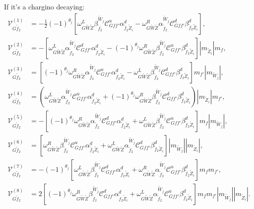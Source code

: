 \documentclass[final,3p,times]{elsarticle}
\begin{document}
If it's a chargino decaying:
\begin{align}
\mathcal{V}_{G \tilde{f}_2}^{(1)} &= -\frac{1}{2}(-1)^{\theta_j}[\omega_{G \tilde{W} \tilde{Z}}^L \beta_{\tilde{f}_2}^{\tilde{W}_j}\mathcal{C}_{G f f'}^u \alpha_{\tilde{f}_2 \tilde{Z}_i}^{d} - \omega_{G \tilde{W} \tilde{Z}}^R \alpha_{\tilde{f}_2}^{\tilde{W}_j} \mathcal{C}_{G f f'}^d \beta_{\tilde{f}_2 \tilde{Z}_i}^{d}],\\
\mathcal{V}_{G \tilde{f}_2}^{(2)} &= -[\omega_{G \tilde{W} \tilde{Z}}^L \alpha_{\tilde{f}_2}^{\tilde{W}_j} \mathcal{C}_{G f f'}^d \alpha_{\tilde{f}_2 \tilde{Z}_i}^{d} - (-1)^{\theta_j} \omega_{G \tilde{W} \tilde{Z}}^R \beta_{\tilde{f}_2}^{\tilde{W}_j} \mathcal{C}_{G f f'}^u \beta_{\tilde{f}_2 \tilde{Z}_i}^{d}]|m_{\tilde{Z}_i}|m_{f}, \\
\mathcal{V}_{G \tilde{f}_2}^{(3)} &= [(-1)^{\theta_j}\omega_{G \tilde{W} \tilde{Z}}^R \alpha_{\tilde{f}_2}^{\tilde{W}_j} \mathcal{C}_{G f f'}^u \alpha_{\tilde{f}_2 \tilde{Z}_i}^{d} - \omega_{G \tilde{W} \tilde{Z}}^L \beta_{\tilde{f}_2}^{\tilde{W}_j} \mathcal{C}_{G f f'}^d \beta_{\tilde{f}_2 \tilde{Z}_i}^{d}]m_{f'}|m_{\tilde{W}_j}| ,\\
\mathcal{V}_{G \tilde{f}_2}^{(4)} &= (\omega_{G \tilde{W} \tilde{Z}}^L \alpha_{\tilde{f}_2}^{\tilde{W}_j} \mathcal{C}_{G f f'}^u \alpha_{\tilde{f}_2 \tilde{Z}_i}^{d} + (-1)^{\theta_j} \omega_{G \tilde{W} \tilde{Z}}^R \beta_{\tilde{f}_2}^{\tilde{W}_j} \mathcal{C}_{G f f'}^d \beta_{\tilde{f}_2 \tilde{Z}_i}^{d})|m_{\tilde{Z}_i}|m_{f'}, \\
\mathcal{V}_{G \tilde{f}_2}^{(5)} &= -[(-1)^{\theta_j}\omega_{G \tilde{W} \tilde{Z}}^R \alpha_{\tilde{f}_2}^{\tilde{W}_j} \mathcal{C}_{G f f'}^d \alpha_{\tilde{f}_2 \tilde{Z}_i}^{d} + \omega_{G \tilde{W} \tilde{Z}}^L \beta_{\tilde{f}_2}^{\tilde{W}_j} \mathcal{C}_{G f f'}^u \beta_{\tilde{f}_2 \tilde{Z}_i}^{d}]m_{f}|m_{\tilde{W}_j}|, \\
\mathcal{V}_{G \tilde{f}_2}^{(6)} &= [\omega_{G \tilde{W} \tilde{Z}}^R \beta_{\tilde{f}_2}^{\tilde{W}_j} \mathcal{C}_{G f f'}^u \alpha_{\tilde{f}_2 \tilde{Z}_i}^{d} + \omega_{G \tilde{W} \tilde{Z}}^L \alpha_{\tilde{f}_2}^{\tilde{W}_j} \mathcal{C}_{G f f'}^d \beta_{\tilde{f}_2 \tilde{Z}_i}^{d}]|m_{\tilde{W}_j}||m_{\tilde{Z}_i}| ,\\
\mathcal{V}_{G \tilde{f}_2}^{(7)} &= -(-1)^{\theta_j}[\omega_{G \tilde{W} \tilde{Z}}^L \beta_{\tilde{f}_2}^{\tilde{W}_j} \mathcal{C}_{G f f'}^d \alpha_{\tilde{f}_2 \tilde{Z}_i}^{d} + \omega_{G \tilde{W} \tilde{Z}}^R \alpha_{\tilde{f}_2}^{\tilde{W}_j} \mathcal{C}_{G f f'}^u \beta_{\tilde{f}_2 \tilde{Z}_i}^{d}]m_{f}m_{f'}, \\
\mathcal{V}_{G \tilde{f}_2}^{(8)} &= 2[(-1)^{\theta_j}\omega_{G \tilde{W} \tilde{Z}}^R \beta_{\tilde{f}_2}^{\tilde{W}_j} \mathcal{C}_{G f f'}^d \alpha_{\tilde{f}_2 \tilde{Z}_i}^{d} + \omega_{G \tilde{W} \tilde{Z}}^L \alpha_{\tilde{f}_2}^{\tilde{W}_j} \mathcal{C}_{G f f'}^u \beta_{\tilde{f}_2 \tilde{Z}_i}^{d}]m_{f}m_{f'}|m_{\tilde{W}_j}||m_{\tilde{Z}_i}|.
\end{align}
\end{document}
